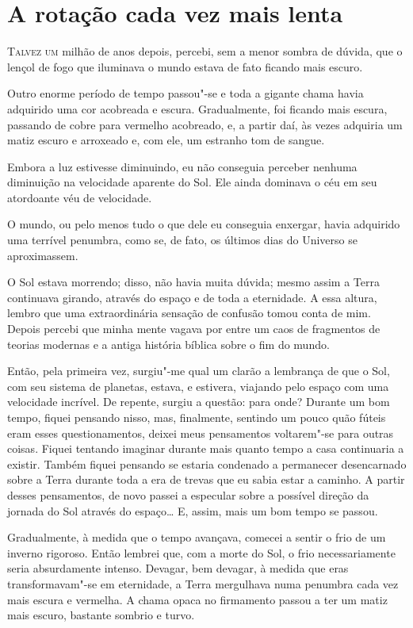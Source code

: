 \clearpage

\chapter{A rotação cada vez mais lenta}

\textsc{Talvez um} milhão de anos depois, percebi, sem a menor sombra de dúvida, que o lençol de fogo que iluminava o mundo
estava de fato ficando mais escuro.

Outro enorme período de tempo passou"-se e toda a gigante chama havia adquirido uma cor acobreada e escura.
Gradualmente, foi ficando mais escura, passando de cobre para vermelho acobreado, e, a partir daí, às vezes adquiria um
matiz escuro e arroxeado e, com ele, um estranho tom de sangue.

Embora a luz estivesse diminuindo, eu não conseguia perceber nenhuma diminuição na velocidade aparente do Sol. Ele
ainda dominava o céu em seu atordoante véu de velocidade. 

O mundo, ou pelo menos tudo o que dele eu conseguia enxergar, havia adquirido uma terrível penumbra, como se, de fato,
os últimos dias do Universo se aproximassem.

O Sol estava morrendo; disso, não havia muita dúvida; mesmo assim a Terra continuava girando, através do espaço e de
toda a eternidade. A essa altura, lembro que uma extraordinária sensação de confusão tomou conta de mim. Depois
percebi que minha mente vagava por entre um caos de fragmentos de teorias modernas e a antiga história bíblica sobre o
fim do mundo.

Então, pela primeira vez, surgiu"-me qual um clarão a lembrança de que o Sol, com seu sistema de planetas, estava, e
estivera, viajando pelo espaço com uma velocidade incrível. De repente, surgiu a questão: para onde? Durante um bom
tempo, fiquei pensando nisso, mas, finalmente, sentindo um pouco quão fúteis eram esses questionamentos, deixei meus
pensamentos voltarem"-se para outras coisas. Fiquei tentando imaginar durante mais quanto tempo a casa continuaria a
existir. Também fiquei pensando se estaria condenado a permanecer desencarnado sobre a Terra durante toda a era de
trevas que eu sabia estar a caminho. A partir desses pensamentos, de novo passei a especular sobre a possível direção da
jornada do Sol através do espaço\ldots{} E, assim, mais um bom tempo se passou.

Gradualmente, à medida que o tempo avançava, comecei a sentir o frio de um inverno rigoroso. Então lembrei que, com a
morte do Sol, o frio necessariamente seria absurdamente intenso. Devagar, bem devagar, à medida que eras
transformavam"-se em eternidade, a Terra mergulhava numa penumbra cada vez mais escura e vermelha. A chama opaca no
firmamento passou a ter um matiz mais escuro, bastante sombrio e turvo.


